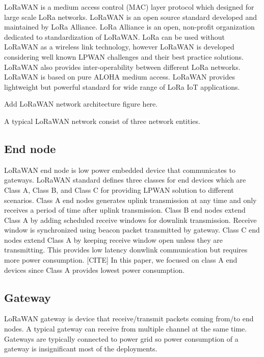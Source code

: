 \documentclass[conference]{IEEEtran}
\begin{document}
\par LoRaWAN is a medium access control (MAC) layer protocol which designed for large scale LoRa networks. LoRaWAN is an open source standard developed and maintained by LoRa Alliance. LoRa Alliance is an open, non-profit organization dedicated to standardization of LoRaWAN. LoRa can be used without LoRaWAN as a wireless link technology, however LoRaWAN is developed considering well known LPWAN challenges and their best practice solutions. LoRaWAN also provides inter-operability between different LoRa networks. LoRaWAN is based on pure ALOHA medium access. LoRaWAN provides lightweight but powerful standard for wide range of LoRa IoT applications.

\par [TODO] Add LoRaWAN network architecture figure here.

\par A typical LoRaWAN network consist of three network entities.

\subsection{End node}
\par LoRaWAN end node is low power embedded device that communicates to gateways. LoRaWAN standard defines three classes for end devices which are Class A, Class B, and Class C for providing LPWAN solution to different scenarios. Class A end nodes generates uplink transmission at any time and only receives a period of time after uplink transmission. Class B end nodes extend Class A by adding scheduled receive windows for downlink transmission. Receive window is synchronized using beacon packet transmitted by gateway. Class C end nodes extend Class A by keeping receive window open unless they are transmitting. This provides low latency donwlink communication but requires more power consumption. [CITE] In this paper, we focused on class A end devices since Class A provides lowest power consumption.

\subsection{Gateway}
\par LoRaWAN gateway is device that receive/transmit packets coming from/to end nodes. A typical gateway can receive from multiple channel at the same time. Gateways are typically connected to power grid so power consumption of a gateway is insignificant most of the deployments.
\end{document}
